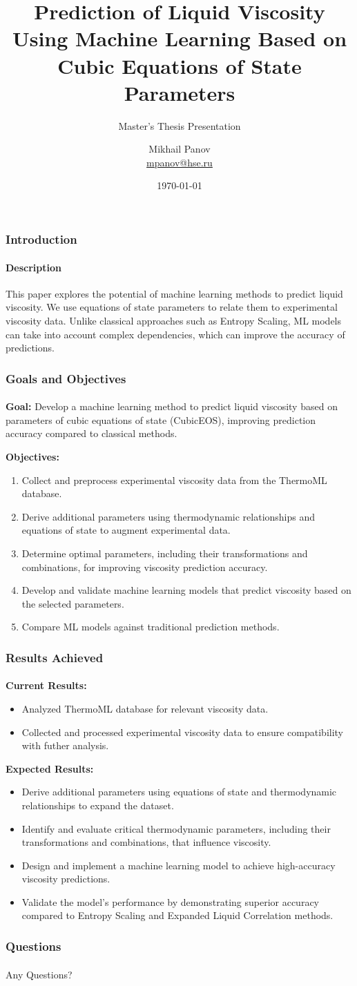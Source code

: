 \documentclass[aspectratio=169]{beamer}
\title[Prediction of Liquid Viscosity]{Prediction of Liquid Viscosity Using Machine Learning Based on Cubic Equations of State Parameters}
\subtitle{Master's Thesis Presentation}
\author[M. Panov]{Mikhail Panov \\ \smallskip \scriptsize \url{mpanov@hse.ru}}
\institute{Department of Applied Mathematics}
\date{\today}
\begin{document}
\frame[plain]{\titlepage}

\begin{frame}
\frametitle{Introduction}
\framesubtitle{Description}
This paper explores the potential of machine learning methods to predict liquid viscosity. We use equations of state parameters to relate them to experimental viscosity data. Unlike classical approaches such as Entropy Scaling, ML models can take into account complex dependencies, which can improve the accuracy of predictions.    
\medskip
\end{frame}

\begin{frame}
\frametitle{Goals and Objectives}
\framesubtitle{}
\textbf{Goal:} Develop a machine learning method to predict liquid viscosity based on parameters of cubic equations of state (CubicEOS), improving prediction accuracy compared to classical methods.

\medskip
\textbf{Objectives:}
\begin{enumerate} 
	\item Collect and preprocess experimental viscosity data from the ThermoML database.
	\item Derive additional parameters using thermodynamic relationships and equations of state to augment experimental data.
	\item Determine optimal parameters, including their transformations and combinations, for improving viscosity prediction accuracy.
	\item Develop and validate machine learning models that predict viscosity based on the selected parameters.
	\item Compare ML models against traditional prediction methods.
\end{enumerate}
\end{frame}

\begin{frame}
\frametitle{Results Achieved}
\framesubtitle{}
\textbf{Current Results:}
\begin{itemize}
    	\item Analyzed ThermoML database for relevant viscosity data.
    	\item Collected and processed experimental viscosity data to ensure compatibility with futher analysis.
\end{itemize}
\medskip
\textbf{Expected Results:}
\begin{itemize}
	\item Derive additional parameters using equations of state and thermodynamic relationships to expand the dataset.
	\item Identify and evaluate critical thermodynamic parameters, including their transformations and combinations, that influence viscosity.
	\item Design and implement a machine learning model to achieve high-accuracy viscosity predictions.
	\item Validate the model’s performance by demonstrating superior accuracy compared to Entropy Scaling and Expanded Liquid Correlation methods.
\end{itemize}
\end{frame}

\begin{frame}
\frametitle{Questions}
\framesubtitle{}
\centering
\Huge{Any Questions?}
\end{frame}
\end{document}
